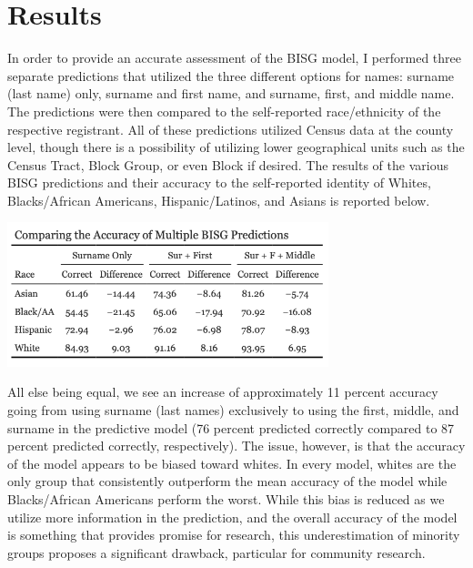 \documentclass[
]{article}
\begin{document}
\hypertarget{results}{%
\section{Results}\label{results}}

In order to provide an accurate assessment of the BISG model, I
performed three separate predictions that utilized the three different
options for names: surname (last name) only, surname and first name, and
surname, first, and middle name. The predictions were then compared to
the self-reported race/ethnicity of the respective registrant. All of
these predictions utilized Census data at the county level, though there
is a possibility of utilizing lower geographical units such as the
Census Tract, Block Group, or even Block if desired. The results of the
various BISG predictions and their accuracy to the self-reported
identity of Whites, Blacks/African Americans, Hispanic/Latinos, and
Asians is reported below.

\includegraphics[width=0.7\textwidth,height=\textheight]{tab1.png}

All else being equal, we see an increase of approximately 11 percent
accuracy going from using surname (last names) exclusively to using the
first, middle, and surname in the predictive model (76 percent predicted
correctly compared to 87 percent predicted correctly, respectively). The
issue, however, is that the accuracy of the model appears to be biased
toward whites. In every model, whites are the only group that
consistently outperform the mean accuracy of the model while
Blacks/African Americans perform the worst. While this bias is reduced
as we utilize more information in the prediction, and the overall
accuracy of the model is something that provides promise for research,
this underestimation of minority groups proposes a significant drawback,
particular for community research.
\end{document}
